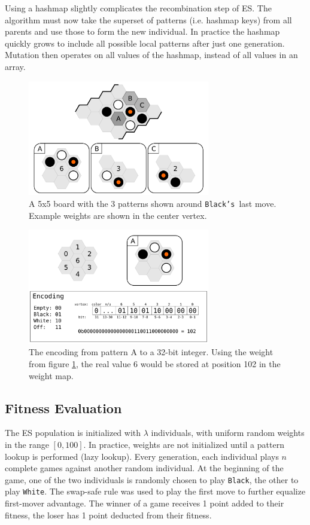 \documentclass[11pt]{report}
\newcommand{\black}{\texttt{Black}}
\newcommand{\white}{\texttt{White}}
\newcommand{\blacks}{\texttt{Black's}}
\begin{document}
Using a hashmap slightly complicates the recombination step of ES. The algorithm must now take the superset of patterns (i.e. hashmap keys) from all parents and use those to form the new individual. In practice the hashmap quickly grows to include all possible local patterns after just one generation. Mutation then operates on all values of the hashmap, instead of all values in an array.

\begin{figure}
	\begin{center}
	\includegraphics[width=300px]{graphics/local-pattern.png}
	\end{center}
	\caption{A 5x5 board with the 3 patterns shown around \blacks\ last move. Example weights are shown in the center vertex.}
	\label{fig:localpattern}
\end{figure}

\begin{figure}
	\begin{center}
	\includegraphics[width=300px]{graphics/weight-pattern-map.png}
	\end{center}
	\caption{The encoding from pattern A to a 32-bit integer. Using the weight from figure \ref{fig:localpattern}, the real value 6 would be stored at position 102 in the weight map.}
	\label{fig:encoding}
\end{figure}

\subsection{Fitness Evaluation}\label{fitness}
The ES population is initialized with $\lambda$ individuals, with uniform random weights in the range $[0, 100]$. In practice, weights are not initialized until a pattern lookup is performed (lazy lookup). Every generation, each individual plays $n$ complete games against another random individual. At the beginning of the game, one of the two individuals is randomly chosen to play \black, the other to play \white. The swap-safe rule was used to play the first move to further equalize first-mover advantage. The winner of a game receives 1 point added to their fitness, the loser has 1 point deducted from their fitness.
\end{document}
